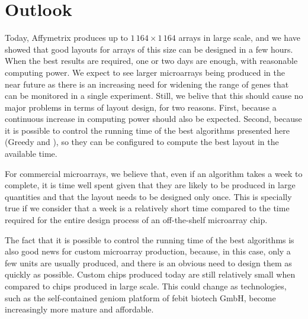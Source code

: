 \section{Outlook}
\label{sec:discuss_outlook}

Today, Affymetrix produces up to $1\,164\times 1\,164$ arrays in large scale,
and we have showed that good layouts for arrays of this size can be designed in
a few hours. When the best results are required, one or two days are enough,
with reasonable computing power. We expect to see larger microarrays being
produced in the near future as there is an increasing need for widening the
range of genes that can be monitored in a single experiment. Still, we belive
that this should cause no major problems in terms of layout design, for two
reasons. First, because a continuous increase in computing power should also be
expected. Second, because it is possible to control the running time of the best
algorithms presented here (Greedy and \Greedyplus), so they can be configured to
compute the best layout in the available time. 

For commercial microarrays, we believe that, even if an algorithm takes a week
to complete, it is time well spent given that they are likely to be produced in
large quantities and that the layout needs to be designed only once. This is
specially true if we consider that a week is a relatively short time compared to
the time required for the entire design process of an off-the-shelf
microarray chip.

The fact that it is possible to control the running time of the best algorithms
is also good news for custom microarray production, because, in this case, only
a few units are usually produced, and there is an obvious need to design them as
quickly as possible. Custom chips produced today are still relatively small when
compared to chips produced in large scale. This could change as
technologies, such as the self-contained {\sffamily geniom} platform of febit
biotech GmbH, become increasingly more mature and affordable.
